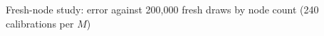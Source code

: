 \begin{table}[ht]
\centering
\caption{Fresh-node study: error against 200,000 fresh draws by node count (240 calibrations per $M$)}
\label{tab:app-holdout}
\small

\end{table}
